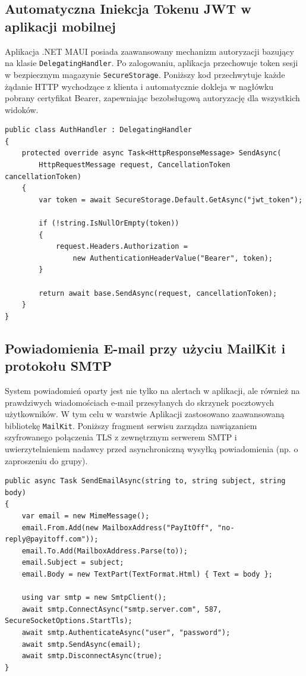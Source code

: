 \documentclass[12pt, a4paper]{article}
\begin{document}
\subsection{Automatyczna Iniekcja Tokenu JWT w aplikacji mobilnej}
Aplikacja .NET MAUI posiada zaawansowany mechanizm autoryzacji bazujący na klasie \texttt{DelegatingHandler}. Po zalogowaniu, aplikacja przechowuje token sesji w bezpiecznym magazynie \texttt{SecureStorage}. Poniższy kod przechwytuje każde żądanie HTTP wychodzące z klienta i automatycznie dokleja w nagłówku pobrany certyfikat Bearer, zapewniając bezobsługową autoryzację dla wszystkich widoków.
\begin{center}
\begin{verbatim}
public class AuthHandler : DelegatingHandler
{
    protected override async Task<HttpResponseMessage> SendAsync(
        HttpRequestMessage request, CancellationToken cancellationToken)
    {
        var token = await SecureStorage.Default.GetAsync("jwt_token");

        if (!string.IsNullOrEmpty(token))
        {
            request.Headers.Authorization = 
                new AuthenticationHeaderValue("Bearer", token);
        }

        return await base.SendAsync(request, cancellationToken);
    }
}
\end{verbatim}
\end{center}

\subsection{Powiadomienia E-mail przy użyciu MailKit i protokołu SMTP}
System powiadomień oparty jest nie tylko na alertach w aplikacji, ale również na prawdziwych wiadomościach e-mail przesyłanych do skrzynek pocztowych użytkowników. W tym celu w warstwie Aplikacji zastosowano zaawansowaną bibliotekę \texttt{MailKit}. Poniższy fragment serwisu zarządza nawiązaniem szyfrowanego połączenia TLS z zewnętrznym serwerem SMTP i uwierzytelnieniem nadawcy przed asynchroniczną wysyłką powiadomienia (np. o zaproszeniu do grupy).
\begin{center}
\begin{verbatim}
public async Task SendEmailAsync(string to, string subject, string body)
{
    var email = new MimeMessage();
    email.From.Add(new MailboxAddress("PayItOff", "no-reply@payitoff.com"));
    email.To.Add(MailboxAddress.Parse(to));
    email.Subject = subject;
    email.Body = new TextPart(TextFormat.Html) { Text = body };

    using var smtp = new SmtpClient();
    await smtp.ConnectAsync("smtp.server.com", 587, SecureSocketOptions.StartTls);
    await smtp.AuthenticateAsync("user", "password");
    await smtp.SendAsync(email);
    await smtp.DisconnectAsync(true);
}
\end{verbatim}
\end{center}
\end{document}
